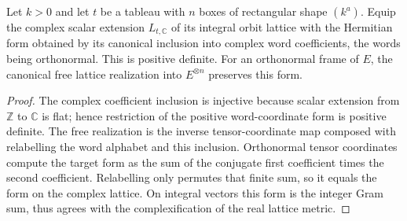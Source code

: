 \begin{lemma}
\label{lem:free-lattice-isometry}
\leanok
Let $k>0$ and let $t$ be a tableau with $n$ boxes of rectangular shape
$(k^a)$. Equip the complex scalar extension $L_{t,\mathbb C}$ of its
integral orbit lattice with
the Hermitian form obtained by its canonical inclusion into complex
word coefficients, the words being orthonormal. This is positive
definite. For an orthonormal frame of $E$, the canonical free lattice
realization into $E^{\otimes n}$ preserves this form.
\end{lemma}
\begin{proof}
The complex coefficient inclusion is injective because scalar extension
from $\mathbb Z$ to $\mathbb C$ is flat; hence restriction of the positive
word-coordinate form is positive definite. The free realization is
the inverse tensor-coordinate map composed with relabelling the word
alphabet and this inclusion. Orthonormal tensor coordinates compute
the target form as the sum of the conjugate first coefficient times
the second coefficient. Relabelling only permutes that finite sum,
so it equals the form on the complex lattice. On integral vectors
this form is the integer Gram sum, thus agrees with the complexification
of the real lattice metric.
\end{proof}

